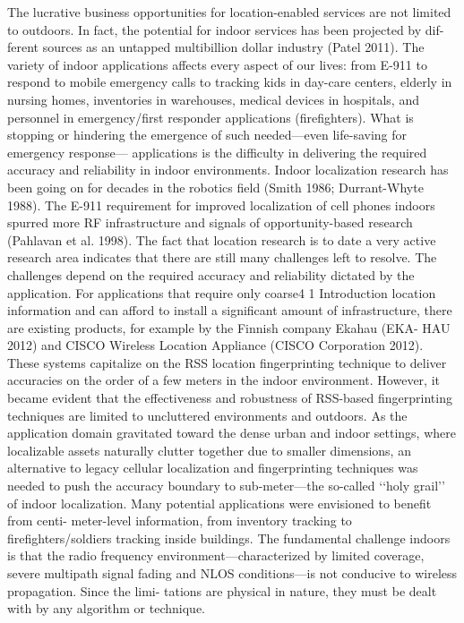 The lucrative business opportunities for location-enabled services are not limited
to outdoors. In fact, the potential for indoor services has been projected by dif-
ferent sources as an untapped multibillion dollar industry (Patel 2011). The variety
of indoor applications affects every aspect of our lives: from E-911 to respond to
mobile emergency calls to tracking kids in day-care centers, elderly in nursing
homes, inventories in warehouses, medical devices in hospitals, and personnel in
emergency/first responder applications (firefighters). What is stopping or hindering
the emergence of such needed—even life-saving for emergency response—
applications is the difficulty in delivering the required accuracy and reliability in
indoor environments. Indoor localization research has been going on for decades
in the robotics field (Smith 1986; Durrant-Whyte 1988). The E-911 requirement
for improved localization of cell phones indoors spurred more RF infrastructure
and signals of opportunity-based research (Pahlavan et al. 1998). The fact that
location research is to date a very active research area indicates that there are still
many challenges left to resolve. The challenges depend on the required accuracy
and reliability dictated by the application. For applications that require only coarse4
1 Introduction
location information and can afford to install a significant amount of infrastructure,
there are existing products, for example by the Finnish company Ekahau (EKA-
HAU 2012) and CISCO Wireless Location Appliance (CISCO Corporation 2012).
These systems capitalize on the RSS location fingerprinting technique to deliver
accuracies on the order of a few meters in the indoor environment. However, it
became evident that the effectiveness and robustness of RSS-based fingerprinting
techniques are limited to uncluttered environments and outdoors.
As the application domain gravitated toward the dense urban and indoor settings,
where localizable assets naturally clutter together due to smaller dimensions, an
alternative to legacy cellular localization and fingerprinting techniques was needed
to push the accuracy boundary to sub-meter—the so-called ‘‘holy grail’’ of indoor
localization. Many potential applications were envisioned to benefit from centi-
meter-level information, from inventory tracking to firefighters/soldiers tracking
inside buildings. The fundamental challenge indoors is that the radio frequency
environment—characterized by limited coverage, severe multipath signal fading
and NLOS conditions—is not conducive to wireless propagation. Since the limi-
tations are physical in nature, they must be dealt with by any algorithm or technique.
